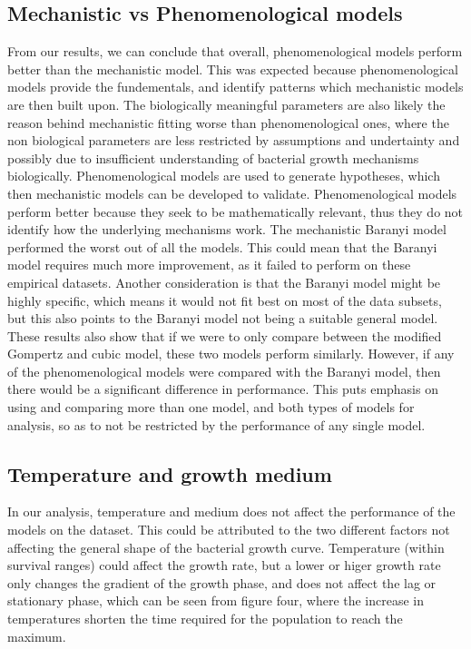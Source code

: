 \documentclass[11pt, a4paper, titlepage]{article}
\begin{document}
\subsection{Mechanistic vs Phenomenological models}
From our results, we can conclude that overall, phenomenological models perform better than the mechanistic model. This was expected because phenomenological models provide the fundementals, and identify patterns which mechanistic models are then built upon. The biologically meaningful parameters are also likely the reason behind mechanistic fitting worse than phenomenological ones, where the non biological parameters are less restricted by assumptions and undertainty \parencite{bok2011, cho2016, esk2007} and possibly due to insufficient understanding of bacterial growth mechanisms biologically. Phenomenological models are used to generate hypotheses, which then mechanistic models can be developed to validate. Phenomenological models perform better because they seek to be mathematically relevant, thus they do not identify how the underlying mechanisms work. The mechanistic Baranyi model performed the worst out of all the models. This could mean that the Baranyi model requires much more improvement, as it failed to perform on these empirical datasets. Another consideration is that the Baranyi model might be highly specific, which means it would not fit best on most of the data subsets, but this also points to the Baranyi model not being a suitable general model.  These results also show that if we were to only compare between the modified Gompertz and cubic model, these two models perform similarly. However, if any of the phenomenological models were compared with the Baranyi model, then there would be a significant difference in performance. This puts emphasis on using and comparing more than one model, and both types of models for analysis, so as to not be restricted by the performance of any single model. 

\subsection{Temperature and growth medium}
In our analysis, temperature and medium does not affect the performance of the models on the dataset. This could be attributed to the two different factors not affecting the general shape of the bacterial growth curve. Temperature (within survival ranges) could affect the growth rate, but a lower or higer growth rate only changes the gradient of the growth phase, and does not affect the lag or stationary phase, which can be seen from figure four, where the increase in temperatures shorten the time required for the population to reach the maximum.
\end{document}
